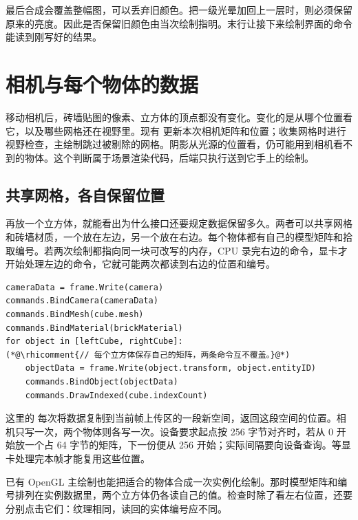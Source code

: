 最后合成会覆盖整幅图，可以丢弃旧颜色。把一级光晕加回上一层时，则必须保留原来的亮度。因此是否保留旧颜色由当次绘制指明。末行让接下来绘制界面的命令能读到刚写好的结果。

\endgroup

\clearpage
\section{相机与每个物体的数据}
移动相机后，砖墙贴图的像素、立方体的顶点都没有变化。变化的是从哪个位置看它，以及哪些网格还在视野里。现有  更新本次相机矩阵和位置；收集网格时进行视野检查，主绘制跳过被剔除的网格。阴影从光源的位置看，仍可能用到相机看不到的物体。这个判断属于场景渲染代码，后端只执行送到它手上的绘制。

\subsection{共享网格，各自保留位置}
再放一个立方体，就能看出为什么接口还要规定数据保留多久。两者可以共享网格和砖墙材质，一个放在左边，另一个放在右边。每个物体都有自己的模型矩阵和拾取编号。若两次绘制都指向同一块可改写的内存，CPU 录完右边的命令，显卡才开始处理左边的命令，它就可能两次都读到右边的位置和编号。

\begin{lstlisting}
cameraData = frame.Write(camera)
commands.BindCamera(cameraData)
commands.BindMesh(cube.mesh)
commands.BindMaterial(brickMaterial)
for object in [leftCube, rightCube]:
(*@\rhicomment{// 每个立方体保存自己的矩阵，两条命令互不覆盖。}@*)
    objectData = frame.Write(object.transform, object.entityID)
    commands.BindObject(objectData)
    commands.DrawIndexed(cube.indexCount)
\end{lstlisting}

这里的  每次将数据复制到当前帧上传区的一段新空间，返回这段空间的位置。相机只写一次，两个物体则各写一次。设备要求起点按 256 字节对齐时，若从 0 开始放一个占 64 字节的矩阵，下一份便从 256 开始；实际间隔要向设备查询。等显卡处理完本帧才能复用这些位置。

已有 OpenGL 主绘制也能把适合的物体合成一次实例化绘制。那时模型矩阵和编号排列在实例数据里，两个立方体仍各读自己的值。检查时除了看左右位置，还要分别点击它们：纹理相同，读回的实体编号应不同。

